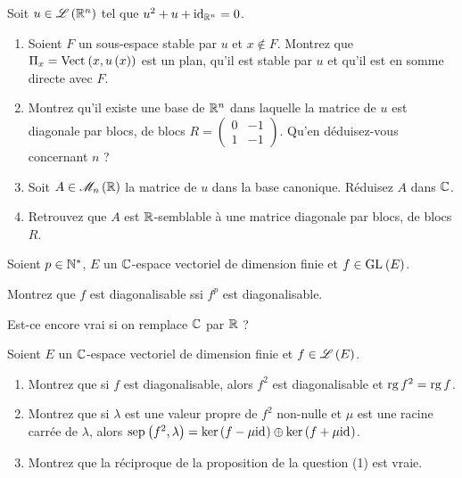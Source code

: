 \begin{exoss}[Exercice 21]
Soit \(u\in\mathscr{L}\left(\mathbb{R}^n\right)\) tel que \(u^2+u+\mathrm{id}_{\mathbb{R}^n}=0\).

\begin{enumerate}
    \item Soient \(F\) un sous-espace stable par \(u\) et \(x\not\in F\). Montrez que \(\Pi_x=\Vect{x,u\paren{x}}\) est un plan, qu'il est stable par \(u\) et qu'il est en somme directe avec \(F\). \\
    \item Montrez qu'il existe une base de \(\mathbb{R}^n\) dans laquelle la matrice de \(u\) est diagonale par blocs, de blocs \(R=\begin{pmatrix}
        0 & -1 \\
        1 & -1
    \end{pmatrix}\). Qu'en déduisez-vous concernant \(n\) ? \\
    \item Soit \(A\in\M{n}[\R]\) la matrice de \(u\) dans la base canonique. Réduisez \(A\) dans \(\mathbb{C}\). \\
    \item Retrouvez que \(A\) est \(\mathbb{R}\)-semblable à une matrice diagonale par blocs, de blocs \(R\).
\end{enumerate}
\end{exoss}



\begin{exoss}[Exercice 22]
Soient \(p\in\mathbb{N}^*\), \(E\) un \(\mathbb{C}\)-espace vectoriel de dimension finie et \(f\in\GL{}[E]\).

Montrez que \(f\) est diagonalisable ssi \(f^p\) est diagonalisable.

Est-ce encore vrai si on remplace \(\mathbb{C}\) par \(\mathbb{R}\) ?
\end{exoss}



\begin{exoss}[Exercice 23]
Soient \(E\) un \(\mathbb{C}\)-espace vectoriel de dimension finie et \(f\in\mathscr{L}\left(E\right)\).

\begin{enumerate}
    \item Montrez que si \(f\) est diagonalisable, alors \(f^2\) est diagonalisable et \(\operatorname{rg} f^2=\operatorname{rg} f\). \\
    \item Montrez que si \(\lambda\) est une valeur propre de \(f^2\) non-nulle et \(\mu\) est une racine carrée de \(\lambda\), alors \(\sep{f^2}{\lambda}=\ker\paren{f-\mu\id{}}\oplus\ker\paren{f+\mu\id{}}\). \\
    \item Montrez que la réciproque de la proposition de la question (1) est vraie.
\end{enumerate}
\end{exoss}




